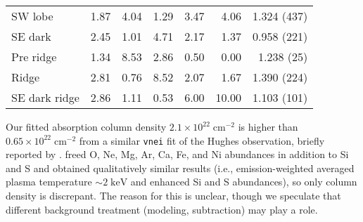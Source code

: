 \documentclass[preprint2,tighten,trackchanges]{aastex6}
\newcommand*{\mt}{\mathrm}
\newcommand*{\unit}[1]{\;\mt{#1}}  %
\newcommand*{\abt}{\mathord{\sim}} %
\begin{document}
\begin{table*}
\begin{tabular}{@{}lrrrrrr@{}}
        SW lobe & 1.87 & 4.04 & 1.29 & 3.47 & 4.06 & 1.324 (437) \\  %
        SE dark & 2.45 & 1.01 & 4.71 & 2.17 & 1.37 & 0.958 (221) \\  %
        \midrule
        Pre ridge & 1.34 & 8.53 & 2.86 & 0.50 & 0.00 & 1.238 (25) \\  %
        Ridge         & 2.81 & 0.76 & 8.52 & 2.07 &  1.67 & 1.390 (224) \\  %
        SE dark ridge & 2.86 & 1.11 & 0.53 & 6.00 & 10.00 & 1.103 (101) \\  %
        \bottomrule
    \end{tabular}
\end{table*}

\begin{figure*}[]
    \label{fig:spec-src}  %
\end{figure*}

Our fitted absorption column density $2.1 \times 10^{22} \unit{cm^{-2}}$ is
higher than $0.65 \times 10^{22} \unit{cm^{-2}}$ from a similar \texttt{vnei}
fit of the Hughes observation, briefly reported by \citet{safi-harb2007}.
\citet{safi-harb2007} freed O, Ne, Mg, Ar, Ca, Fe, and Ni abundances in
addition to Si and S and obtained qualitatively similar results (i.e.,
emission-weighted averaged plasma temperature $\abt 2 \unit{keV}$ and enhanced
Si and S abundances), so only column density is discrepant.
The reason for this is unclear, though we speculate that different background
treatment (modeling, subtraction) may play a role.
\end{document}
